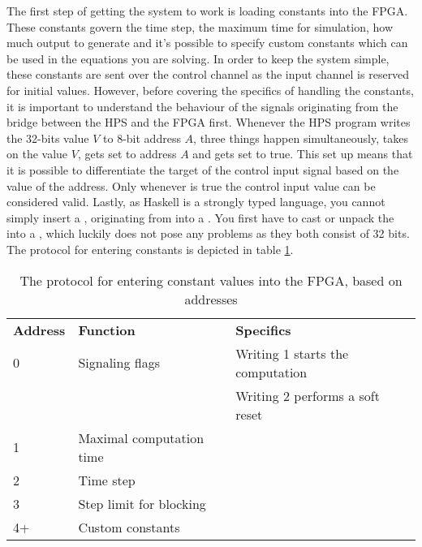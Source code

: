 

The first step of getting the system to work is loading constants into the FPGA. These constants govern the time step, the maximum time for simulation, how much output to generate and it's possible to specify custom constants which can be used in the equations you are solving. In order to keep the system simple, these constants are sent over the control channel as the input channel is reserved for initial values. However, before covering the specifics of handling the constants, it is important to understand the behaviour of the signals originating from the bridge between the HPS and the FPGA first. Whenever the HPS program writes the 32-bits value $V$ to 8-bit address $A$, three things happen simultaneously,  takes on the value $V$,  gets set to address $A$ and  gets set to true. This set up means that it is possible to differentiate the target of the control input signal based on the value of the address. Only whenever  is true the control input value can be considered valid. Lastly, as Haskell is a strongly typed language, you cannot simply insert a , originating from  into a . You first have to cast or unpack the  into a , which luckily does not pose any problems as they both consist of 32 bits. The protocol for entering constants is depicted in table \ref{t:control_protocol}.

\begin{table}[h]
	\caption{The protocol for entering constant values into the FPGA, based on addresses}
	\label{t:control_protocol}

	\begin{tabular}{l l l}
		\textbf{Address} & \textbf{Function} &  \textbf{Specifics} \\
		0 	& Signaling flags 			& Writing 1 starts the computation \\
		& 				 				& Writing 2 performs a soft reset \\
		1 	& Maximal computation time 	& \\
		2 	& Time step 				& \\
		3 	& Step limit for blocking	& \\ 
		4+ 	& Custom constants 			& \\
	\end{tabular}
\end{table}

